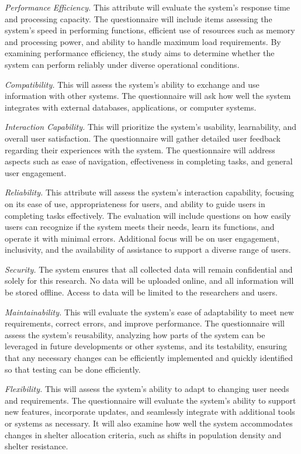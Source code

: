 	\textit{Performance Efficiency.} This attribute will evaluate the system's response time and processing capacity. The questionnaire will include items assessing the system's speed in performing functions, efficient use of resources such as memory and processing power, and ability to handle maximum load requirements. By examining performance efficiency, the study aims to determine whether the system can perform reliably under diverse operational conditions.
	
	\textit{Compatibility.} This will assess the system’s ability to exchange and use information with other systems. The questionnaire will ask how well the system integrates with external databases, applications, or computer systems. 
	
	\textit{Interaction Capability.} This will prioritize the system's usability, learnability, and overall user satisfaction. The questionnaire will gather detailed user feedback regarding their experiences with the system. The questionnaire will address aspects such as ease of navigation, effectiveness in completing tasks, and general user engagement.
	
	\textit{Reliability.} This attribute will assess the system's interaction capability, focusing on its ease of use, appropriateness for users, and ability to guide users in completing tasks effectively. The evaluation will include questions on how easily users can recognize if the system meets their needs, learn its functions, and operate it with minimal errors. Additional focus will be on user engagement, inclusivity, and the availability of assistance to support a diverse range of users. 
	
	\textit{Security.} The system ensures that all collected data will remain confidential and solely for this research. No data will be uploaded online, and all information will be stored offline. Access to data will be limited to the researchers and users.
	
	\textit{Maintainability.} This will evaluate the system's ease of adaptability to meet new requirements, correct errors, and improve performance. The questionnaire will assess the system's reusability, analyzing how parts of the system can be leveraged in future developments or other systems, and its testability, ensuring that any necessary changes can be efficiently implemented and quickly identified so that testing can be done efficiently. 
	
	\textit{Flexibility.} This will assess the system’s ability to adapt to changing user needs and requirements. The questionnaire will evaluate the system's ability to support new features, incorporate updates, and seamlessly integrate with additional tools or systems as necessary. It will also examine how well the system accommodates changes in shelter allocation criteria, such as shifts in population density and shelter resistance.
	
